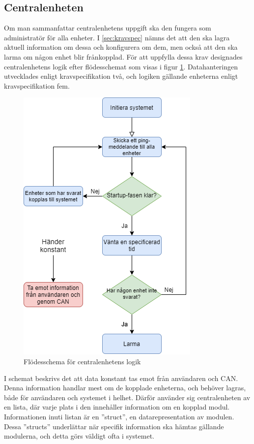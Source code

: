 \subsection{Centralenheten}
\label{sec:centralenhetenDE}
Om man sammanfattar centralenhetens uppgift ska den fungera som administratör för alla enheter. I \ref{sec:kravspec} nämns det att den ska lagra aktuell information om dessa och konfigurera om dem, men också att den ska larma om någon enhet blir frånkopplad. För att uppfylla dessa krav designades centralenhetens logik efter flödesschemat som visas i figur \ref{fig:centralflöd}. Datahanteringen utvecklades enligt kravspecifikation två, och logiken gällande enheterna enligt kravspecifikation fem.
\newline \newline
\begin{figure}[h]
    \centering
    \includegraphics[scale=0.6]{dokumentation/projektrapport/IMAGES/centralenhet_flowchart.png}
    \caption{Flödesschema för centralenhetens logik}
    \label{fig:centralflöd}
\end{figure}
\newline \newline
I schemat beskrivs det att data konstant tas emot från användaren och CAN. Denna information handlar mest om de kopplade enheterna, och behöver lagras, både för användaren och systemet i helhet. Därför använder sig centralenheten av en lista, där varje plats i den innehåller information om en kopplad modul. Informationen inuti listan är en ''struct'', en datarepresentation av modulen. Dessa ''structs'' underlättar när specifik information ska hämtas gällande modulerna, och detta görs väldigt ofta i systemet.

